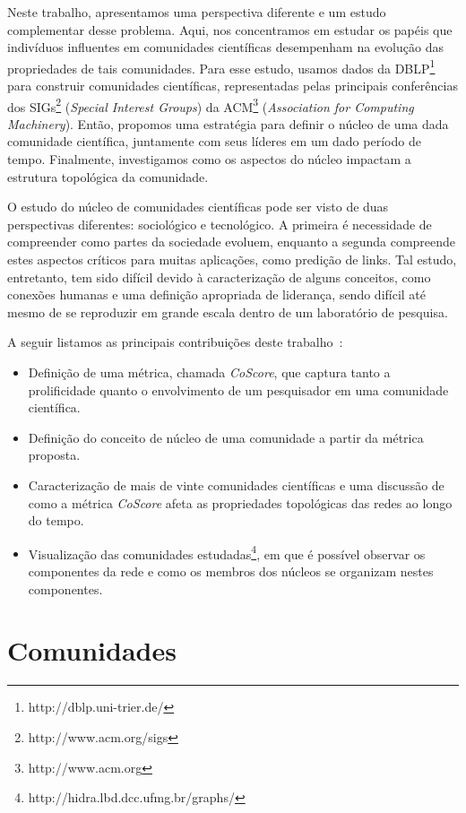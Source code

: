 \documentclass[12pt]{article}
\begin{document}
Neste trabalho, apresentamos uma perspectiva diferente e um estudo complementar desse problema. 
Aqui, nos concentramos em estudar os papéis que indivíduos influentes em comunidades científicas
desempenham na evolução das propriedades de tais comunidades. Para esse 
estudo, usamos dados da DBLP\footnote{http://dblp.uni-trier.de/} para construir 
comunidades científicas, representadas pelas principais conferências
dos SIGs\footnote{http://www.acm.org/sigs} (\textit{Special Interest Groups}) da ACM\footnote{http://www.acm.org}
(\textit{Association for Computing Machinery}). Então, propomos uma estratégia para definir o 
núcleo de uma dada comunidade científica, juntamente com seus líderes em um dado período de 
tempo. Finalmente, investigamos como os aspectos do núcleo impactam a estrutura topológica da comunidade.

O estudo do núcleo de comunidades científicas pode ser visto de duas perspectivas diferentes: sociológico
e tecnológico. A 
primeira é necessidade de compreender como partes da sociedade evoluem, enquanto a segunda compreende estes 
aspectos críticos para muitas aplicações, como predição de links. Tal estudo, entretanto, 
tem sido difícil devido à caracterização de alguns conceitos, como conexões humanas e uma definição apropriada 
de liderança, sendo difícil até mesmo de se reproduzir em grande escala dentro de um laboratório de pesquisa.

A seguir listamos as principais contribuições deste trabalho~\cite{Alves2013}:

\begin{itemize}
 \item Definição de uma métrica, chamada \textit{CoScore}, que captura tanto a prolificidade quanto o 
       envolvimento de um pesquisador em uma comunidade científica.
 \item Definição do conceito de núcleo de uma comunidade a partir da métrica proposta.
 \item Caracterização de mais de vinte comunidades científicas e uma discussão de como a métrica \textit{CoScore} afeta 
       as propriedades topológicas das redes ao longo do tempo.
 \item Visualização das comunidades estudadas\footnote{http://hidra.lbd.dcc.ufmg.br/graphs/}, em que é possível observar os componentes da rede e como os membros 
       dos núcleos se organizam nestes 
       componentes.
 
\end{itemize}

\section{Comunidades}
\end{document}
